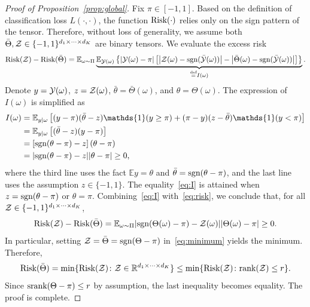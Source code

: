 \documentclass[twoside,11pt]{article}
\theoremstyle{plain}
\theoremstyle{definition}
\newcommand*{\KeepStyleUnderBrace}[1]{%
  \mathop{%
    \mathchoice
    {\underbrace{\displaystyle#1}}%
    {\underbrace{\textstyle#1}}%
    {\underbrace{\scriptstyle#1}}%
    {\underbrace{\scriptscriptstyle#1}}%
  }\limits
}
\def\sign{\textup{sgn}}
\def\srank{\textup{srank}}
\def\rank{\textup{rank}}
\def\risk{\textup{Risk}}
\begin{document}
\begin{proof}[Proof of Proposition~\ref{prop:global}]
Fix $\pi\in[-1,1]$. Based on the definition of classification loss $L(\cdot,\cdot)$, the function $\risk(\cdot)$ relies only on the sign pattern of the tensor. Therefore, without loss of generality, we assume both $\bar \Theta, \mathcal{Z} \in\{-1,1\}^{d_1\times \cdots \times d_K}$ are binary tensors. 
We evaluate the excess risk 
\begin{equation}\label{eq:risk}
\risk(\tZ)- \risk(\bar \Theta) = \mathbb{E}_{\omega\sim \Pi}\KeepStyleUnderBrace{\mathbb{E}_{\tY(\omega)}\left\{|\tY(\omega)-\pi|\left[\left|\tZ(\omega)-\sign(\bar \tY(\omega)) \right|-\left|\bar\Theta(\omega)-\sign(\bar \tY(\omega))\right|\right]\right\}}_{\stackrel{\text{def}}{=}I(\omega)}.
\end{equation}
Denote $y=\mathcal{Y}(\omega)$, $z=\mathcal{Z}(\omega)$, $\bar \theta=\bar\Theta(\omega)$, and $\theta=\Theta(\omega)$. The expression of $I(\omega)$ is simplified as
\begin{align}\label{eq:I}
I(\omega)&= \mathbb{E}_{y|\omega}\left[ (y-\pi)(\bar \theta-z)\mathds{1}(y\geq \pi)+(\pi-y)(z-\bar \theta)\mathds{1}(y< \pi)\right]\notag \\
&= \mathbb{E}_{y|\omega}\left[(\bar \theta-z) (y-\pi)\right]\notag \\
&=  \left[\sign(\theta-\pi)-z\right]\left(\theta-\pi\right)\notag \\
&= |\sign(\theta-\pi)-z||\theta-\pi|\geq 0,
\end{align}
where the third line uses the fact $\mathbb{E}y=\theta$ and $\bar \theta=\sign(\theta-\pi)$, and the last line uses the assumption $z \in\{-1,1\}$. The equality~\eqref{eq:I} is attained when $z=\sign(\theta-\pi)$ or $\theta=\pi$. Combining~\eqref{eq:I} with~\eqref{eq:risk}, we conclude that, for all $\mathcal{Z}\in\{-1,1\}^{d_1\times \cdots \times d_K}$, 
\begin{equation}\label{eq:minimum}
\risk(\tZ)- \risk(\bar \Theta) = \mathbb{E}_{\omega\sim \Pi} |\sign(\Theta(\omega)-\pi)-\tZ(\omega)||\Theta(\omega)-\pi|\geq 0.
\end{equation}
In particular, setting $\tZ=\bar \Theta=\sign(\Theta-\pi)$ in~\eqref{eq:minimum} yields the minimum. Therefore, 
\[
\risk(\bar \Theta)=\min\{\risk(\tZ)\colon \tZ\in \mathbb{R}^{d_1\times \cdots \times d_K}\} \leq \min\{\risk(\tZ)\colon \rank(\tZ)\leq r\}.
\]
Since $\srank(\Theta-\pi)\leq r$ by assumption, the last inequality becomes equality. The proof is complete. 
\end{proof}
\end{document}
